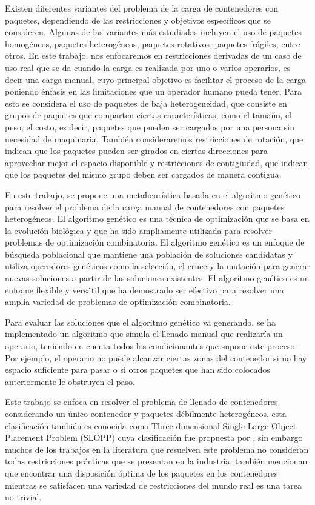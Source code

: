 Existen diferentes variantes del problema de la carga de contenedores con paquetes, dependiendo de las restricciones y objetivos específicos que se consideren. Algunas de las variantes más estudiadas incluyen el uso de paquetes homogéneos, paquetes heterogéneos, paquetes rotativos, paquetes frágiles, entre otros. En este trabajo, nos enfocaremos en restricciones derivadas de un caso de uso real que se da cuando la carga es realizada por uno o varios operarios, es decir una carga manual, cuyo principal objetivo es facilitar el proceso de la carga poniendo énfasis en las limitaciones que un operador humano pueda tener. Para esto se considera el uso de paquetes de baja heterogeneidad, que consiste en grupos de paquetes que comparten ciertas características, como el tamaño, el peso, el costo, es decir, paquetes que pueden ser cargados por una persona sin necesidad de maquinaria. También consideraremos restricciones de rotación, que indican que los paquetes pueden ser girados en ciertas direcciones para aprovechar mejor el espacio disponible y restricciones de contigüidad, que indican que los paquetes del mismo grupo deben ser cargados de manera contigua.

En este trabajo, se propone una metaheurística basada en el algoritmo genético para resolver el problema de la carga manual de contenedores con paquetes heterogéneos. El algoritmo genético es una técnica de optimización que se basa en la evolución biológica y que ha sido ampliamente utilizada para resolver problemas de optimización combinatoria. El algoritmo genético es un enfoque de búsqueda poblacional que mantiene una población de soluciones candidatas y utiliza operadores genéticos como la selección, el cruce y la mutación para generar nuevas soluciones a partir de las soluciones existentes. El algoritmo genético es un enfoque flexible y versátil que ha demostrado ser efectivo para resolver una amplia variedad de problemas de optimización combinatoria.

Para evaluar las soluciones que el algoritmo genético va generando, se ha implementado un algoritmo que simula el llenado manual que realizaría un operario, teniendo en cuenta todos los condicionantes que supone este proceso. Por ejemplo, el operario no puede alcanzar ciertas zonas del contenedor si no hay espacio suficiente para pasar o si otros paquetes que han sido colocados anteriormente le obstruyen el paso.

Este trabajo se enfoca en resolver el problema de llenado de contenedores considerando un único contenedor y paquetes débilmente heterogéneos, esta clasificación también es conocida como Three-dimensional Single Large Object Placement Problem (SLOPP) cuya clasificación fue propuesta por \textcite{WASCHER20071109}, sin embargo muchos de los trabajos en la literatura que resuelven este problema no consideran todas restricciones prácticas que se presentan en la industria. \textcite{SAFAK2023106199} también mencionan que encontrar una disposición óptima de los paquetes en los contenedores mientras se satisfacen una variedad de restricciones del mundo real es una tarea no trivial.

